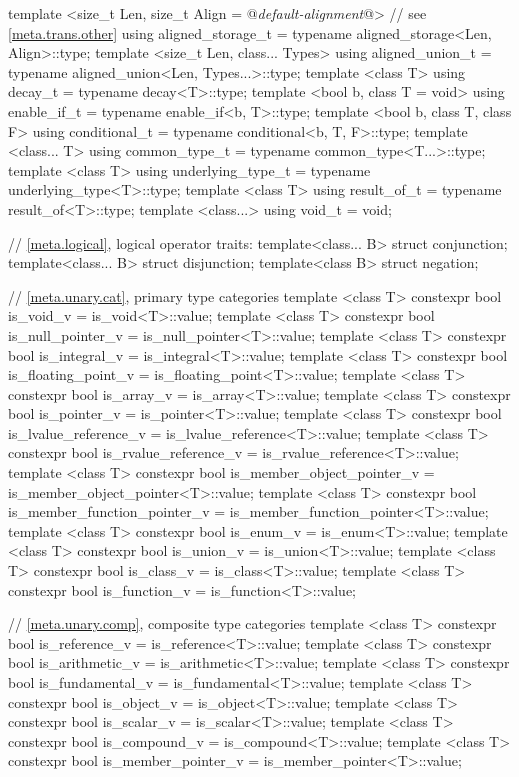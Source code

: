 \begin{codeblock}
{  template <size_t Len,
            size_t Align = @\textit{default-alignment}@> // see \ref{meta.trans.other}
    using aligned_storage_t = typename aligned_storage<Len, Align>::type;
  template <size_t Len, class... Types>
    using aligned_union_t   = typename aligned_union<Len, Types...>::type;
  template <class T>
    using decay_t           = typename decay<T>::type;
  template <bool b, class T = void>
    using enable_if_t       = typename enable_if<b, T>::type;
  template <bool b, class T, class F>
    using conditional_t     = typename conditional<b, T, F>::type;
  template <class... T>
    using common_type_t     = typename common_type<T...>::type;
  template <class T>
    using underlying_type_t = typename underlying_type<T>::type;
  template <class T>
    using result_of_t       = typename result_of<T>::type;  
  template <class...>
    using void_t            = void;

  // \ref{meta.logical}, logical operator traits:
  template<class... B> struct conjunction;
  template<class... B> struct disjunction;
  template<class B> struct negation;

  // \ref{meta.unary.cat}, primary type categories
  template <class T> constexpr bool is_void_v
    = is_void<T>::value;
  template <class T> constexpr bool is_null_pointer_v
    = is_null_pointer<T>::value;
  template <class T> constexpr bool is_integral_v
    = is_integral<T>::value;
  template <class T> constexpr bool is_floating_point_v
    = is_floating_point<T>::value;
  template <class T> constexpr bool is_array_v
    = is_array<T>::value;
  template <class T> constexpr bool is_pointer_v
    = is_pointer<T>::value;
  template <class T> constexpr bool is_lvalue_reference_v
    = is_lvalue_reference<T>::value;
  template <class T> constexpr bool is_rvalue_reference_v
    = is_rvalue_reference<T>::value;
  template <class T> constexpr bool is_member_object_pointer_v
    = is_member_object_pointer<T>::value;
  template <class T> constexpr bool is_member_function_pointer_v
    = is_member_function_pointer<T>::value;
  template <class T> constexpr bool is_enum_v
    = is_enum<T>::value;
  template <class T> constexpr bool is_union_v
    = is_union<T>::value;
  template <class T> constexpr bool is_class_v
    = is_class<T>::value;
  template <class T> constexpr bool is_function_v
    = is_function<T>::value;

  // \ref{meta.unary.comp}, composite type categories
  template <class T> constexpr bool is_reference_v
    = is_reference<T>::value;
  template <class T> constexpr bool is_arithmetic_v
    = is_arithmetic<T>::value;
  template <class T> constexpr bool is_fundamental_v
    = is_fundamental<T>::value;
  template <class T> constexpr bool is_object_v
    = is_object<T>::value;
  template <class T> constexpr bool is_scalar_v
    = is_scalar<T>::value;
  template <class T> constexpr bool is_compound_v
    = is_compound<T>::value;
  template <class T> constexpr bool is_member_pointer_v
    = is_member_pointer<T>::value;

}
\end{codeblock}
